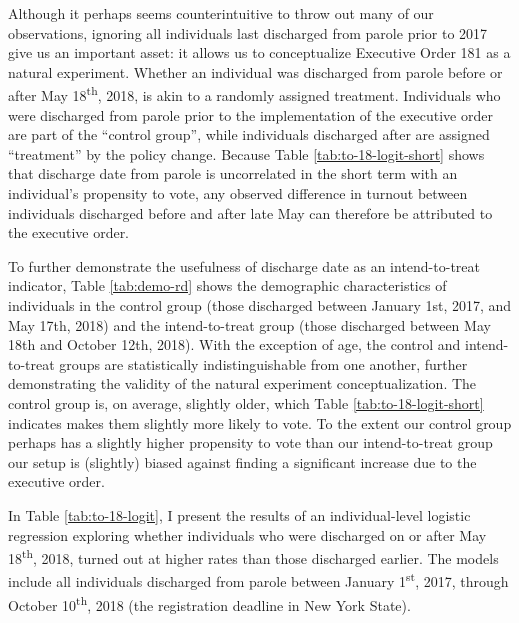 \documentclass[
  12pt,
]{article}
\begin{document}
Although it perhaps seems counterintuitive to throw out many of our observations, ignoring all individuals last discharged from parole prior to 2017 give us an important asset: it allows us to conceptualize Executive Order 181 as a natural experiment. Whether an individual was discharged from parole before or after May 18\textsuperscript{th}, 2018, is akin to a randomly assigned treatment. Individuals who were discharged from parole prior to the implementation of the executive order are part of the ``control group'', while individuals discharged after are assigned ``treatment'' by the policy change. Because Table \ref{tab:to-18-logit-short} shows that discharge date from parole is uncorrelated in the short term with an individual's propensity to vote, any observed difference in turnout between individuals discharged before and after late May can therefore be attributed to the executive order.

To further demonstrate the usefulness of discharge date as an intend-to-treat indicator, Table \ref{tab:demo-rd} shows the demographic characteristics of individuals in the control group (those discharged between January 1st, 2017, and May 17th, 2018) and the intend-to-treat group (those discharged between May 18th and October 12th, 2018). With the exception of age, the control and intend-to-treat groups are statistically indistinguishable from one another, further demonstrating the validity of the natural experiment conceptualization. The control group is, on average, slightly older, which Table \ref{tab:to-18-logit-short} indicates makes them slightly more likely to vote. To the extent our control group perhaps has a slightly higher propensity to vote than our intend-to-treat group our setup is (slightly) biased against finding a significant increase due to the executive order.

\begin{singlespace}


\end{singlespace}

In Table \ref{tab:to-18-logit}, I present the results of an individual-level logistic regression exploring whether individuals who were discharged on or after May 18\textsuperscript{th}, 2018, turned out at higher rates than those discharged earlier. The models include all individuals discharged from parole between January 1\textsuperscript{st}, 2017, through October 10\textsuperscript{th}, 2018 (the registration deadline in New York State).
\end{document}
